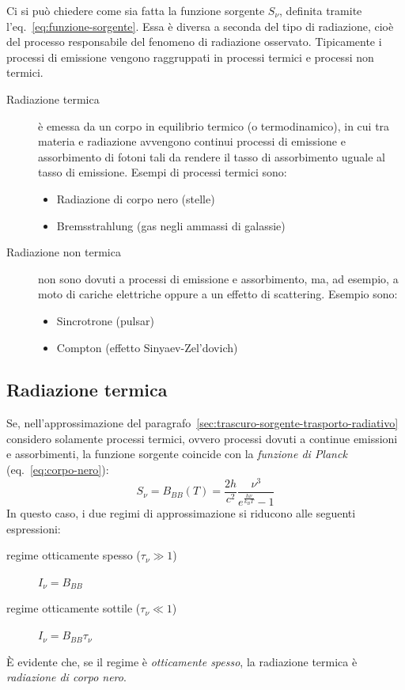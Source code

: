 Ci si può chiedere come sia fatta la funzione sorgente $S_\nu$, definita tramite l'eq.~\eqref{eq:funzione-sorgente}. Essa è diversa a seconda del tipo di radiazione, cioè del processo responsabile del fenomeno di radiazione osservato. Tipicamente i processi di emissione vengono raggruppati in processi termici e processi non termici.
\begin{description}
    \item[Radiazione termica] è emessa da un corpo in equilibrio termico (o termodinamico), in cui tra materia e radiazione avvengono continui processi di emissione e assorbimento di fotoni tali da rendere il tasso di assorbimento uguale al tasso di emissione. Esempi di processi termici sono:
    \begin{itemize}
        \item Radiazione di corpo nero (stelle)
        \item Bremsstrahlung (gas negli ammassi di galassie)
    \end{itemize}
    
    \item[Radiazione non termica] non sono dovuti a processi di emissione e assorbimento, ma, ad esempio, a moto di cariche elettriche oppure a un effetto di scattering. Esempio sono:
    \begin{itemize}
        \item Sincrotrone (pulsar)
        \item Compton (effetto Sinyaev-Zel'dovich)
    \end{itemize}
\end{description}

\subsection{Radiazione termica}
Se, nell'approssimazione del paragrafo~\ref{sec:trascuro-sorgente-trasporto-radiativo} considero solamente processi termici, ovvero processi dovuti a continue emissioni e assorbimenti, la funzione sorgente coincide con la \emph{funzione di Planck} (eq.~\eqref{eq:corpo-nero}):
\[
    S_\nu = B_{BB} (T) = \frac{2 h}{c^2} \frac{\nu^3}{e^{\frac{h \nu}{k_B T}} - 1}
\]
In questo caso, i due regimi di approssimazione si riducono alle seguenti espressioni:
\begin{description}
    \item[regime otticamente spesso ($\tau_\nu \gg 1$)] $I_\nu = B_{BB}$
    \item[regime otticamente sottile ($\tau_\nu \ll 1$)] $I_\nu = B_{BB} \tau_\nu$
\end{description}
È evidente che, se il regime è \emph{otticamente spesso}, la radiazione termica è \emph{radiazione di corpo nero}.
